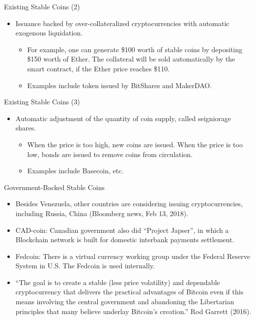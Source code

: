 \documentclass[notes=show, beamer, handout]{beamer}
\begin{document}
\begin{frame}{Existing Stable Coins (2)}

\begin{itemize}
\item  Issuance backed by over-collateralized cryptocurrencies with automatic exogenous liquidation.
\begin{itemize}
\item For example, one can generate \$100 worth of stable coins by depositing \$150 worth of Ether. The collateral will be sold automatically by the smart contract, if the Ether price reaches \$110.
\item  Examples include token issued by BitShares and MakerDAO.
\end{itemize}
\end{itemize}
\end{frame}

\begin{frame}{Existing Stable Coins (3)}

\begin{itemize}
\item Automatic adjustment of the quantity of coin supply, called seigniorage shares.
\begin{itemize}
\item When the price is too high, new coins are issued. When the price is too low, bonds are issued to remove coins from circulation.
\item  Examples include Basecoin, etc.
\end{itemize}

\end{itemize}
\end{frame}

\begin{frame}{Government-Backed Stable Coins}

\begin{itemize}
\item Besides Venezuela, other countries are considering issuing cryptocurrencies, including Russia, China (Bloomberg news, Feb 13, 2018).
\item CAD-coin: Canadian government also did ``Project Japser'', in which a Blockchain network is built for domestic interbank payments settlement.
\item Fedcoin: There is a virtual currency working group under the Federal Reserve System in U.S. The Fedcoin is used internally. 
\item ``The goal is to create a stable (less price volatility) and dependable cryptocurrency that delivers the practical advantages of Bitcoin even if this means involving the central government and abandoning the Libertarian principles that many believe underlay Bitcoin’s creation.'' Rod Garrett (2016).
\end{itemize}

\end{frame}
\end{document}
